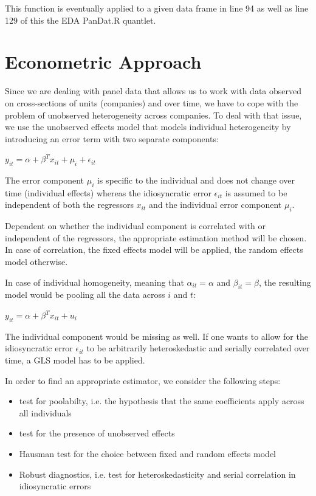 \documentclass[a4paper]{article}
\begin{document}
This function is eventually applied to a given data frame in line 94 as well as line 129 of this the EDA PanDat.R quantlet.

\section{Econometric Approach}

Since we are dealing with panel data that allows us to work with data observed on cross-sections of units (companies) and over time, we have to cope with the problem of unobserved heterogeneity across companies. To deal with that issue, we use the unobserved effects model that models individual heterogeneity by introducing an error term with two separate components:

$y_{it} = \alpha + \beta^{T} x_{it} + \mu_i + \epsilon_{it}$

The error component $\mu_i$ is specific to the individual and does not change over time (individual effects) whereas the idiosyncratic error $\epsilon_{it}$ is assumed to be independent of both the regressors $x_{it}$ and the individual error component $\mu_i$.

Dependent on whether the individual component is correlated with or independent of the regressors, the appropriate estimation method will be chosen. In case of correlation, the fixed effects model will be applied, the random effects model otherwise. 

In case of individual homogeneity, meaning that $\alpha_{it}=\alpha$ and $\beta_{it}=\beta$, the resulting model would be pooling all the data across $i$ and $t$:

$y_{it}=\alpha+\beta^{T}x_{it}+u_{i}$

The individual component would be missing as well. 
If one wants to allow for the idiosyncratic error $\epsilon_{it}$ to be arbitrarily heteroskedastic and serially correlated over time, a GLS model has to be applied. 

In order to find an appropriate estimator, we consider the following steps:
\begin{itemize}
\item
test for poolabilty, i.e. the hypothesis that the same coefficients apply across all individuals
\item
test for the presence of unobserved effects
\item
Hausman test for the choice between fixed and random effects model
\item
Robust diagnostics, i.e. test for heteroskedasticity and serial correlation in idiosyncratic errors
\end{itemize}
\end{document}
